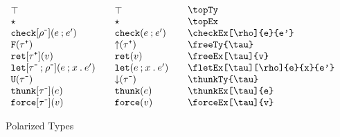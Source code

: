 \documentclass[11pt]{article}
\begin{document}
\begin{figure}

  \begin{small}
    \begin{displaymath}
      \begin{array}{l@{\qquad}l@{\qquad}l@{\qquad}l}
        \topTy                                        & \topTy*                   & \verb|\topTy| \\
        \topEx                                        & \topEx*                   & \verb|\topEx| \\
        \checkEx[\negTy{\rho}]{e}{e'}                 & \checkEx*{e}{e'}          & \verb|\checkEx[\rho]{e}{e'}| \\
        \freeTy{\posTy{\tau}}                         & \freeTy*{\posTy{\tau}}    & \verb|\freeTy{\tau}|                         \\
        \freeEx[\posTy{\tau}]{v}                      & \freeEx*[\posTy{\tau}]{v} & \verb|\freeEx[\tau]{v}|                      \\
        \fletEx[\negTy{\tau}][\negTy{\rho}]{e}{x}{e'} & \fletEx*{e}{x}{e'}        & \verb|\fletEx[\tau][\rho]{e}{x}{e'}| \\
        \thunkTy{\negTy{\tau}}                        & \thunkTy*{\negTy{\tau}}   & \verb|\thunkTy{\tau}|                        \\
        \thunkEx[\negTy{\tau}]{e}                     & \thunkEx*{e}              & \verb|\thunkEx[\tau]{e}|                     \\
        \forceEx[\negTy{\tau}]{v}                     & \forceEx*{v}              & \verb|\forceEx[\tau]{v}|
      \end{array}
    \end{displaymath}
  \end{small}

  \caption{Polarized Types}
  \label{fig:pol}
\end{figure}
\end{document}
